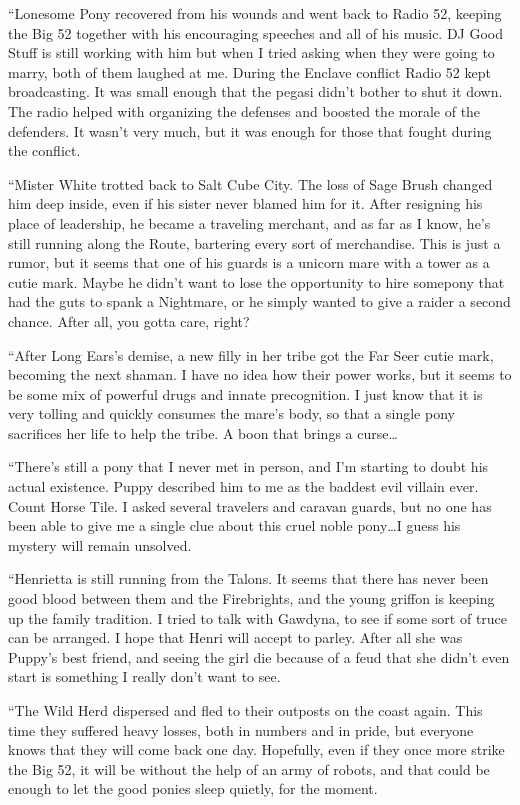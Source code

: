 {``Lonesome Pony recovered from his wounds and went back to Radio 52, keeping the Big 52 together with his encouraging speeches and all of his music. DJ Good Stuff is still working with him but when I tried asking when they were going to marry, both of them laughed at me. During the Enclave conflict Radio 52 kept broadcasting. It was small enough that the pegasi didn't bother to shut it down. The radio helped with organizing the defenses and boosted the morale of the defenders. It wasn't very much, but it was enough for those that fought during the conflict.

``Mister White trotted back to Salt Cube City. The loss of Sage Brush changed him deep inside, even if his sister never blamed him for it. After resigning his place of leadership, he became a traveling merchant, and as far as I know, he's still running along the Route, bartering every sort of merchandise. This is just a rumor, but it seems that one of his guards is a unicorn mare with a tower as a cutie mark. Maybe he didn't want to lose the opportunity to hire somepony that had the guts to spank a Nightmare, or he simply wanted to give a raider a second chance. After all, you gotta care, right?

``After Long Ears's demise, a new filly in her tribe got the Far Seer cutie mark, becoming the next shaman. I have no idea how their power works, but it seems to be some mix of powerful drugs and innate precognition. I just know that it is very tolling and quickly consumes the mare's body, so that a single pony sacrifices her life to help the tribe. A boon that brings a curse\dots

``There's still a pony that I never met in person, and I'm starting to doubt his actual existence. Puppy described him to me as the baddest evil villain ever. Count Horse Tile. I asked several travelers and caravan guards, but no one has been able to give me a single clue about this cruel noble pony\dots I guess his mystery will remain unsolved.

``Henrietta is still running from the Talons. It seems that there has never been good blood between them and the Firebrights, and the young griffon is keeping up the family tradition. I tried to talk with Gawdyna, to see if some sort of truce can be arranged. I hope that Henri will accept to parley. After all she was Puppy's best friend, and seeing the girl die because of a feud that she didn't even start is something I really don't want to see.

``The Wild Herd dispersed and fled to their outposts on the coast again. This time they suffered heavy losses, both in numbers and in pride, but everyone knows that they will come back one day. Hopefully, even if they once more strike the Big 52, it will be without the help of an army of robots, and that could be enough to let the good ponies sleep quietly, for the moment.

}
